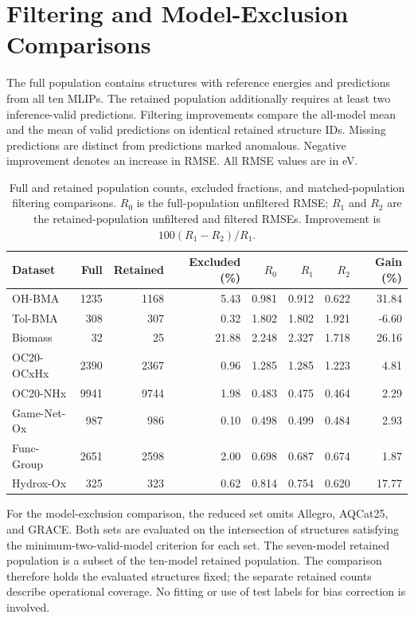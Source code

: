 \section{Filtering and Model-Exclusion Comparisons}
\label{sec:si-revision-comparisons}

The full population contains structures with reference energies and predictions from all ten MLIPs. The retained population additionally requires at least two inference-valid predictions. Filtering improvements compare the all-model mean and the mean of valid predictions on identical retained structure IDs. Missing predictions are distinct from predictions marked anomalous. Negative improvement denotes an increase in RMSE. All RMSE values are in eV.

\begin{table}[ht]
\centering
\caption{Full and retained population counts, excluded fractions, and matched-population filtering comparisons. $R_0$ is the full-population unfiltered RMSE; $R_1$ and $R_2$ are the retained-population unfiltered and filtered RMSEs. Improvement is $100(R_1-R_2)/R_1$.}
\label{tab:si-matched-filtering}
\small
\begin{tabular}{lrrrrrrr}
\toprule
Dataset & Full & Retained & Excluded (\%) & $R_0$ & $R_1$ & $R_2$ & Gain (\%) \\
\midrule
OH-BMA & 1235 & 1168 & 5.43 & 0.981 & 0.912 & 0.622 & 31.84 \\
Tol-BMA & 308 & 307 & 0.32 & 1.802 & 1.802 & 1.921 & -6.60 \\
Biomass & 32 & 25 & 21.88 & 2.248 & 2.327 & 1.718 & 26.16 \\
OC20-OCxHx & 2390 & 2367 & 0.96 & 1.285 & 1.285 & 1.223 & 4.81 \\
OC20-NHx & 9941 & 9744 & 1.98 & 0.483 & 0.475 & 0.464 & 2.29 \\
Game-Net-Ox & 987 & 986 & 0.10 & 0.498 & 0.499 & 0.484 & 2.93 \\
Func-Group & 2651 & 2598 & 2.00 & 0.698 & 0.687 & 0.674 & 1.87 \\
Hydrox-Ox & 325 & 323 & 0.62 & 0.814 & 0.754 & 0.620 & 17.77 \\
\bottomrule
\end{tabular}
\end{table}

For the model-exclusion comparison, the reduced set omits Allegro, AQCat25, and GRACE. Both sets are evaluated on the intersection of structures satisfying the minimum-two-valid-model criterion for each set. The seven-model retained population is a subset of the ten-model retained population. The comparison therefore holds the evaluated structures fixed; the separate retained counts describe operational coverage. No fitting or use of test labels for bias correction is involved.

